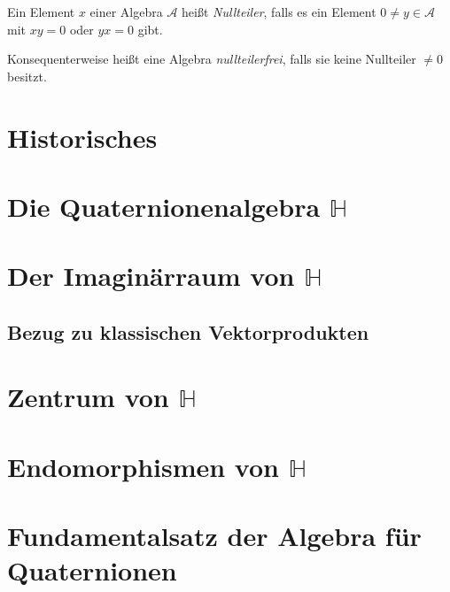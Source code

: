 \documentclass[aspectratio=169]{beamer}
\begin{document}
    \begin{frame}
        \begin{definition}
            Ein Element \(x\) einer Algebra \(\mathcal{A}\) heißt \textit{Nullteiler}, falls es ein Element \(0 \neq y \in \mathcal{A}\) mit \(xy = 0\) oder \(yx = 0\) gibt.

            Konsequenterweise heißt eine Algebra \textit{nullteilerfrei}, falls sie keine Nullteiler \(\neq 0\) besitzt.
        \end{definition}
    \end{frame}

    \section{Historisches}

    \section{Die Quaternionenalgebra \(\mathbb{H}\)}
    \section{Der Imaginärraum von \(\mathbb{H}\)}
    \subsection{Bezug zu klassischen Vektorprodukten}
    \section{Zentrum von \(\mathbb{H}\)}
    \section{Endomorphismen von \(\mathbb{H}\)}
    \section{Fundamentalsatz der Algebra für Quaternionen}
\end{document}

